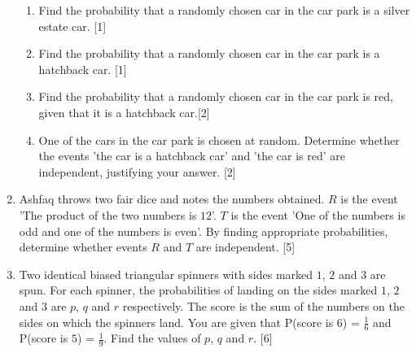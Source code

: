 \begin{enumerate}
\begin{enumerate}
	\item Find the probability that a randomly chosen car in the car park is a silver estate car. \hfill [1]
	\item Find the probability that a randomly chosen car in the car park is a hatchback car. \hfill[1]
	\item Find the probability that a randomly chosen car in the car park is red, given that it is a hatchback
	car.\hfill [2]
	\item  One of the cars in the car park is chosen at random. Determine whether the events 'the car is a hatchback car' and 'the car is red' are independent, justifying your answer. \hfill [2]
\end{enumerate}
		
		
		
		

\item	Ashfaq throws two fair dice and notes the numbers obtained. $R$ is the event 'The product of the two numbers is $12$'.  $T$ is the event 'One of the numbers is odd and one of the numbers is even'. By finding appropriate probabilities, determine whether events $R$ and $T$ are independent.	 \hfill  [5]
		
		
		

\item		Two identical biased triangular spinners with sides marked $1$, $2$ and $3$ are spun. For each spinner, the probabilities of landing on the sides marked $1$, $2$ and $3$ are $p$, $q$ and $r$ respectively. The score is the sum of the numbers on the sides on which the spinners land. You are given that P(score is $6$) = $\frac{1}{6}$ and P(score is $5$) = $\frac{1}{9}$. Find the values of $p$, $q$ and $r$. \hfill [6]
		


\end{enumerate}
